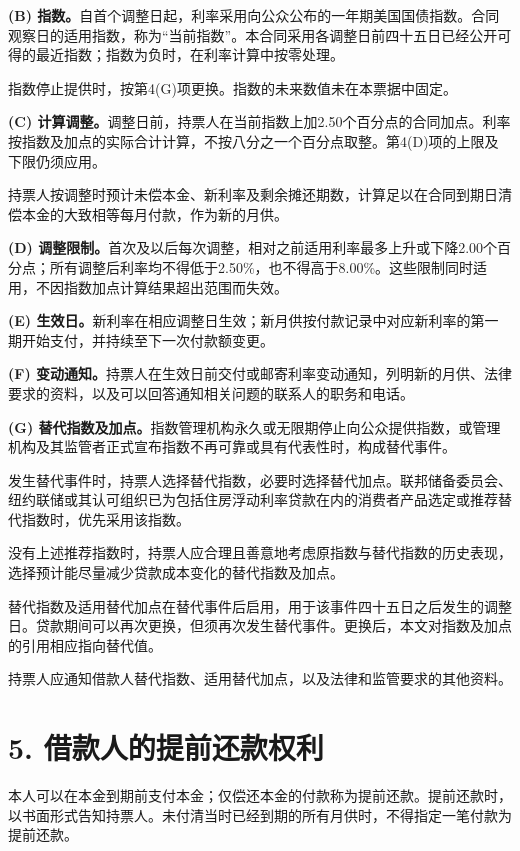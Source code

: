 \documentclass[UTF8,fontset=none,11pt,a4paper]{ctexart}
\begin{document}
\textbf{(B) 指数。}自首个调整日起，利率采用向公众公布的一年期美国国债指数。合同观察日的适用指数，称为“当前指数”。本合同采用各调整日前四十五日已经公开可得的最近指数；指数为负时，在利率计算中\allowbreak\mbox{按零处理。}


指数停止提供时，按第4(G)项更换。指数的未来数值未在本票\allowbreak\mbox{据中固定。}


\textbf{(C) 计算调整。}调整日前，持票人在当前指数上加2.50个百分点的合同加点。利率按指数及加点的实际合计计算，不按八分之一个百分点取整。第4(D)项的上限及下限\allowbreak\mbox{仍须应用。}


持票人按调整时预计未偿本金、新利率及剩余摊还期数，计算足以在合同到期日清偿本金的大致相等每月付款，作为\allowbreak\mbox{新的月供。}


\textbf{(D) 调整限制。}首次及以后每次调整，相对之前适用利率最多上升或下降2.00个百分点；所有调整后利率均不得低于2.50\%，也不得高于8.00\%。这些限制同时适用，不因指数加点计算结果超出范\allowbreak\mbox{围而失效。}


\textbf{(E) 生效日。}新利率在相应调整日生效；新月供按付款记录中对应新利率的第一期开始支付，并持续至下一次付\allowbreak\mbox{款额变更。}


\textbf{(F) 变动通知。}持票人在生效日前交付或邮寄利率变动通知，列明新的月供、法律要求的资料，以及可以回答通知相关问题的联系人的职\allowbreak\mbox{务和电话。}


\textbf{(G) 替代指数及加点。}指数管理机构永久或无限期停止向公众提供指数，或管理机构及其监管者正式宣布指数不再可靠或具有代表性时，构成\allowbreak\mbox{替代事件。}


发生替代事件时，持票人选择替代指数，必要时选择替代加点。联邦储备委员会、纽约联储或其认可组织已为包括住房浮动利率贷款在内的消费者产品选定或推荐替代指数时，优先采\allowbreak\mbox{用该指数。}


没有上述推荐指数时，持票人应合理且善意地考虑原指数与替代指数的历史表现，选择预计能尽量减少贷款成本变化的替代指\allowbreak\mbox{数及加点。}


替代指数及适用替代加点在替代事件后启用，用于该事件四十五日之后发生的调整日。贷款期间可以再次更换，但须再次发生替代事件。更换后，本文对指数及加点的引用相应指\allowbreak\mbox{向替代值。}


持票人应通知借款人替代指数、适用替代加点，以及法律和监管要求的\allowbreak\mbox{其他资料。}


\section*{5. 借款人的提前还款权利}
本人可以在本金到期前支付本金；仅偿还本金的付款称为提前还款。提前还款时，以书面形式告知持票人。未付清当时已经到期的所有月供时，不得指定一笔付款为\allowbreak\mbox{提前还款。}
\end{document}
